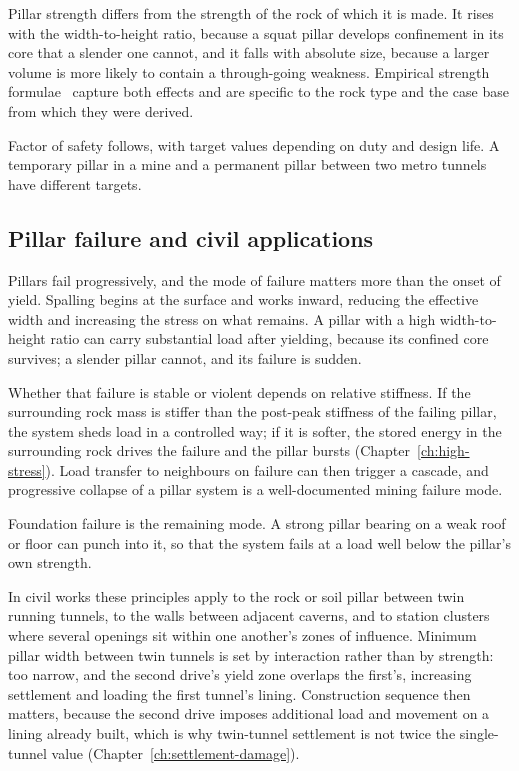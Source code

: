 Pillar strength differs from the strength of the rock of which it is made. It rises with
the width-to-height ratio, because a squat pillar develops confinement in its
core that a slender one cannot, and it falls with absolute size, because a
larger volume is more likely to contain a through-going weakness. Empirical
strength formulae~\citep{salamon1967pillar} capture both effects and are specific to the rock type and
the case base from which they were derived.

Factor of safety follows, with target values depending on duty and design
life. A temporary pillar in a mine and a permanent pillar between two metro
tunnels have different targets.

\subsection{Pillar failure and civil applications}
\label{sec:pillar-failure-civil}

Pillars fail progressively, and the mode of failure matters more than the
onset of yield. Spalling begins at the surface and works inward, reducing the effective
width and increasing the stress on what remains. A pillar with a high
width-to-height ratio can carry substantial load after yielding, because its
confined core survives; a slender pillar cannot, and its failure is sudden.

Whether that failure is stable or violent depends on relative stiffness. If
the surrounding rock mass is stiffer than the post-peak stiffness of the
failing pillar, the system sheds load in a controlled way; if it is softer,
the stored energy in the surrounding rock drives the failure and the pillar
bursts (Chapter~\ref{ch:high-stress}). Load transfer to neighbours on failure can
then trigger a cascade, and progressive collapse of a pillar system is a
well-documented mining failure mode.

Foundation failure is the remaining mode. A strong pillar bearing on a weak roof
or floor can punch into it, so that the system fails at a load well below the
pillar's own strength.

In civil works these principles apply to the rock or soil pillar between twin
running tunnels, to the walls between adjacent caverns, and to station
clusters where several openings sit within one another's zones of influence.
Minimum pillar width between twin tunnels is set by interaction rather than by
strength: too narrow, and the second drive's yield zone overlaps the first's,
increasing settlement and loading the first tunnel's lining. Construction
sequence then matters, because the second drive imposes additional load and
movement on a lining already built, which is why twin-tunnel settlement is
not twice the single-tunnel value
(Chapter~\ref{ch:settlement-damage}).

\chapterreferences
